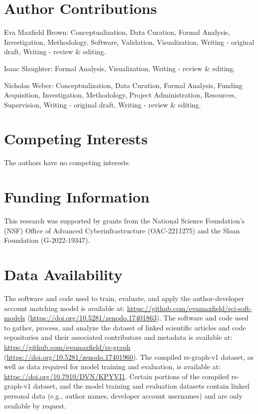 \documentclass[
  number,
  3p,
  onecolumn]{elsarticle}
\begin{document}
\section*{Author Contributions}\label{author-contributions}

Eva Maxfield Brown: Conceptualization, Data Curation, Formal Analysis,
Investigation, Methodology, Software, Validation, Visualization, Writing
- original draft, Writing - review \& editing.

Isaac Slaughter: Formal Analysis, Visualization, Writing - review \&
editing.

Nicholas Weber: Conceptualization, Data Curation, Formal Analysis,
Funding Acquisition, Investigation, Methodology, Project Administration,
Resources, Supervision, Writing - original draft, Writing - review \&
editing.

\section*{Competing Interests}\label{competing-interests}

The authors have no competing interests.

\section*{Funding Information}\label{funding-information}

This research was supported by grants from the National Science
Foundation's (NSF) Office of Advanced Cyberinfrastructure (OAC-2211275)
and the Sloan Foundation (G-2022-19347).

\section*{Data Availability}\label{data-availability}

The software and code used to train, evaluate, and apply the
author-developer account matching model is available at:
\url{https://github.com/evamaxfield/sci-soft-models}
(\url{https://doi.org/10.5281/zenodo.17401863}). The software and code
used to gather, process, and analyze the dataset of linked scientific
articles and code repositories and their associated contributors and
metadata is available at: \url{https://github.com/evamaxfield/rs-graph}
(\url{https://doi.org/10.5281/zenodo.17401960}). The compiled
rs-graph-v1 dataset, as well as data required for model training and
evaluation, is available at: \url{https://doi.org/10.7910/DVN/KPYVI1}.
Certain portions of the compiled rs-graph-v1 dataset, and the model
training and evaluation datasets contain linked personal data (e.g.,
author names, developer account usernames) and are only available by
request.
\end{document}
